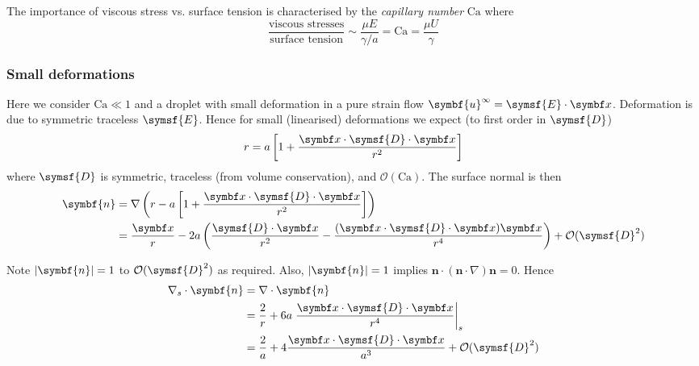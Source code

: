 \documentclass{jknotes}
\begin{document}
The importance of viscous stress vs. surface tension is characterised by the
\emph{capillary number} $\text{Ca}$ where 
\begin{equation}
	\frac{\text{viscous stresses}}{\text{surface tension}} \sim \frac{\mu
	E}{\gamma/a} = \text{Ca} = \frac{\mu U}{\gamma}
\end{equation}

\subsubsection{Small deformations}
Here we consider $\text{Ca} \ll 1$ and a droplet with small deformation in a
pure strain flow $\symbf{u}^\infty = \symsf{E}\cdot\x$. Deformation is due to
symmetric traceless $\symsf{E}$. Hence for small (linearised) deformations we
expect (to first order in $\symsf{D}$)
\begin{equation}
	r= a\left[ 1 + \frac{\x \cdot \symsf{D}\cdot\x}{r^2}\right]
\end{equation}
where $\symsf{D}$ is symmetric, traceless (from volume conservation), and
$\mathcal{O}(\text{Ca})$. The surface normal is then
\begin{align}
	\symbf{n} &= \nabla \left( r - a\left[1 + \frac{\x \cdot
\symsf{D}\cdot\x}{r^2}\right]\right) \\
&= \frac{\x}{r} - 2a \left( \frac{\symsf{D}\cdot\x}{r^2} -
\frac{(\x\cdot\symsf{D}\cdot\x)\x}{r^4}\right) + \mathcal{O}(\symsf{D}^2)
\end{align}

Note $\abs{\symbf{n}} =1$ to $\mathcal{O}(\symsf{D}^2)$ as required. Also,
$\abs{\symbf{n}} = 1$ implies $\symbf{n}\cdot(\symbf{n}\cdot\nabla)\symbf{n} =
0$. Hence 
\begin{align}
	\nabla_s \cdot \symbf{n} &= \nabla \cdot \symbf{n} \\
		&= \frac{2}{r} + 6a \left.\frac{\x \cdot \symsf{D}\cdot\x}{r^4}\right|_s \\ 
	 &= \frac{2}{a} + 4\frac{\x \cdot \symsf{D}\cdot\x}{a^3} +
	\mathcal{O}(\symsf{D}^2)
\end{align}
\end{document}
